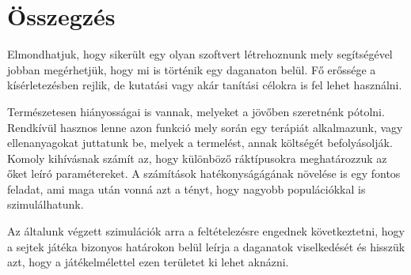 \section{Összegzés}

Elmondhatjuk, hogy sikerült egy olyan szoftvert létrehoznunk mely segítségével jobban megérhetjük, hogy mi is történik egy daganaton belül. Fő erőssége a kísérletezésben rejlik, de kutatási vagy akár tanítási célokra is fel lehet használni.

Természetesen hiányosságai is vannak, melyeket a jövőben szeretnénk pótolni. Rendkívül hasznos lenne azon funkció mely során egy terápiát alkalmazunk, vagy ellenanyagokat juttatunk be, melyek a termelést, annak költségét befolyásolják. Komoly kihívásnak számít az, hogy különböző ráktípusokra meghatározzuk az őket leíró paramétereket. A számítások hatékonyságágának növelése is egy fontos feladat, ami maga után vonná azt a tényt, hogy nagyobb populációkkal is szimulálhatunk. 

Az általunk végzett szimulációk arra a feltételezésre engednek következtetni, hogy a sejtek játéka bizonyos határokon belül leírja a daganatok viselkedését és hisszük azt, hogy a játékelmélettel ezen területet ki lehet aknázni.